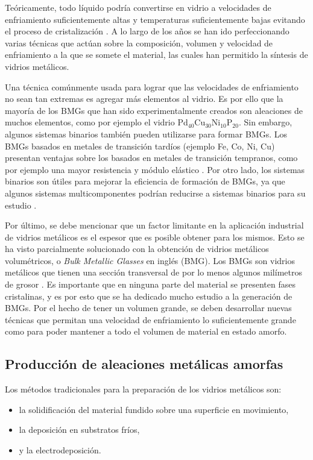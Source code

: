 Teóricamente, todo líquido podría convertirse en vidrio a velocidades de enfriamiento suficientemente altas y temperaturas suficientemente bajas evitando el proceso de cristalización \citep{turnbull61}. A lo largo de los años se han ido perfeccionando varias técnicas que actúan sobre la composición, volumen y velocidad de enfriamiento a la que se somete el material, las cuales han permitido la síntesis de vidrios metálicos.

Una técnica comúnmente usada para lograr que las velocidades de enfriamiento no sean tan extremas es agregar más elementos al vidrio. Es por ello que la mayoría de los BMGs que han sido experimentalmente creados son aleaciones de muchos elementos, como por ejemplo el vidrio Pd$_{40}$Cu$_{30}$Ni$_{10}$P$_{20}$. Sin embargo, algunos sistemas binarios también pueden utilizarse para formar BMGs. Los BMGs basados en metales de transición tardíos (ejemplo Fe, Co, Ni, Cu) presentan ventajas sobre los basados en metales de transición tempranos, como por ejemplo una mayor resistencia y módulo elástico \citep{Xu04}. Por otro lado, los sistemas binarios son útiles para mejorar la eficiencia de formación de BMGs, ya que algunos sistemas multicomponentes podrían reducirse a sistemas binarios para su estudio \citep{Duan05}.

Por último, se debe mencionar que un factor limitante en la aplicación industrial de vidrios metálicos es el espesor que es posible obtener para los mismos. Esto se ha visto parcialmente solucionado con la obtención de vidrios metálicos volumétricos, o \textit{Bulk Metallic Glasses} en inglés (BMG). Los BMGs son vidrios metálicos que tienen una sección transversal de por lo menos algunos milímetros de grosor \citep{suryana11}. Es importante que en ninguna parte del material se presenten fases cristalinas, y es por esto que se ha dedicado mucho estudio a la generación de BMGs. Por el hecho de tener un volumen grande, se deben desarrollar nuevas técnicas que permitan una velocidad de enfriamiento lo suficientemente grande como para poder mantener a todo el volumen de material en estado amorfo.

\subsection{Producción de aleaciones metálicas amorfas}
\label{S1_1_1}

Los métodos tradicionales para la preparación de los vidrios metálicos son:

\begin{itemize}
 \item la solidificación del material fundido sobre una superficie en movimiento,
 \item la deposición en substratos fríos,
 \item y la electrodeposición.
\end{itemize}

